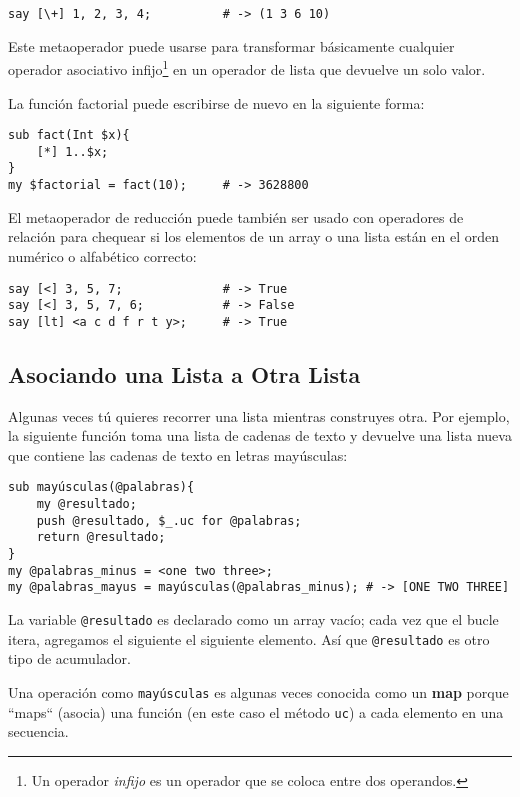 \begin{lstlisting}
say [\+] 1, 2, 3, 4;          # -> (1 3 6 10)
\end{lstlisting}

Este metaoperador puede usarse para transformar básicamente
cualquier operador asociativo infijo\footnote{Un operador 
\emph{infijo} es un operador que se coloca
entre dos operandos.} en un operador de lista 
que devuelve un solo valor.


La función factorial puede escribirse de nuevo
en la siguiente forma:

\begin{lstlisting}
sub fact(Int $x){
    [*] 1..$x; 
}
my $factorial = fact(10);     # -> 3628800
\end{lstlisting}

El metaoperador de reducción puede también ser usado con
operadores de relación para chequear si los elementos de
un array o una lista están en el orden numérico o alfabético
correcto:

\begin{lstlisting}
say [<] 3, 5, 7;              # -> True
say [<] 3, 5, 7, 6;           # -> False
say [lt] <a c d f r t y>;     # -> True
\end{lstlisting}

\subsection{Asociando una Lista a Otra Lista}

Algunas veces tú quieres recorrer una lista mientras 
construyes otra. Por ejemplo, la siguiente función toma una
lista de cadenas de texto y devuelve una lista nueva que 
contiene las cadenas de texto en letras mayúsculas:

\begin{lstlisting}
sub mayúsculas(@palabras){
    my @resultado;
    push @resultado, $_.uc for @palabras;
    return @resultado;
}
my @palabras_minus = <one two three>;
my @palabras_mayus = mayúsculas(@palabras_minus); # -> [ONE TWO THREE]
\end{lstlisting}
%
La variable \verb|@resultado| es declarado como un array vacío;
cada vez que el bucle itera, agregamos el siguiente el 
siguiente elemento. Así que \verb|@resultado| es otro tipo de
acumulador.

Una operación como \verb|mayúsculas| es algunas veces conocida
como un {\bf map} porque ``maps`` (asocia) una función (en este
caso el método {\tt uc}) a cada elemento en una secuencia.

